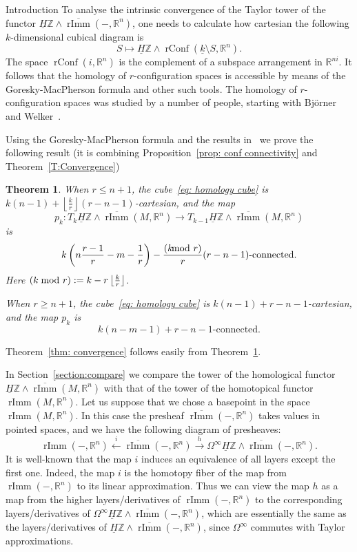 \documentclass[12pt]{amsart}
\newcommand{\R}{{\mathbb R}}
\newcommand{\Z}{{\mathbb Z}}
\newcommand{\rImm}{\operatorname{rImm}}
\newcommand{\rbar}{\overline{\rImm}}
\newcommand{\rConf}{\operatorname{rConf}}
\newcommand{\HZ}{\underline{H}\Z}
\theoremstyle{plain}
\newtheorem{thm}{Theorem}[section]
\theoremstyle{definition}
\theoremstyle{remark}
\begin{document}
\begin{section}{Introduction}
To analyse the intrinsic convergence of the Taylor tower of the functor $\HZ\wedge \rbar(-, \R^n)$, one needs to calculate how cartesian the following $k$-dimensional cubical diagram is
\begin{equation}\label{eq: homology cube}
S\mapsto \HZ \wedge \rConf(\underline{k}\setminus S, \R^n).
\end{equation}
The space $\rConf(i, \R^n)$ is the complement of a subspace arrangement in $\R^{ni}$. It follows that the homology of $r$-configuration spaces is accessible by means of the Goresky-MacPherson formula and other such tools. The homology of $r$-configuration spaces was studied by a number of people, starting with Bj\"orner and Welker~\cite{Bjo95}.

Using the Goresky-MacPherson formula and the results in~\cite{Bjo95} we prove the following result (it is combining Proposition~\ref{prop: conf connectivity} and Theorem~\ref{T:Convergence})
\begin{thm}\label{thm: connectivity}
When $r\le n+1$, the cube~\eqref{eq: homology cube} is $k(n-1)+\left\lfloor \frac{k}{r}\right\rfloor (r-n-1)$-cartesian, and the map
\begin{equation*}
p_k\colon T_k\HZ\wedge \rbar(M, \R^n)\to T_{k-1}\HZ\wedge \rbar(M, \R^n)
\end{equation*}
is $$k\left(n\frac{r-1}{r}-m-\frac{1}{r}\right)-\frac{(k\hspace{-8pt}\mod r)}{r} (r-n-1)\mbox{-connected.}$$ Here $(k\hspace{-4pt}\mod r):=k-r\left\lfloor \frac{k}{r}\right\rfloor$.

When $r\ge n+1$, the cube~\eqref{eq: homology cube} is $k(n-1)+r-n-1$-cartesian, and the map $p_k$ is $$k(n-m-1)+r-n-1\mbox{-connected.}$$
\end{thm}
Theorem~\ref{thm: convergence} follows easily from Theorem~\ref{thm: connectivity}.

In Section~\ref{section:compare} we compare the tower of the homological functor $\HZ\wedge \rbar(M, \R^n)$ with that of the tower of the homotopical functor $\rImm(M, \R^n)$. Let us suppose that we chose a basepoint in the space $\rImm(M, \R^n)$. In this case the presheaf $\rbar(-, \R^n)$ takes values in pointed spaces, and we have the following diagram of presheaves:
\begin{equation}\label{eq: comparison}
\rImm(-, \R^n)\xleftarrow{i} \rbar(-, \R^n) %
\xrightarrow{h} \Omega^\infty\HZ\wedge \rbar(-, \R^n).
\end{equation}
It is well-known that the map $i$ induces an equivalence of all layers except the first one. Indeed, the map $i$ is the homotopy fiber of the map from $\rImm(-, \R^n)$ to its linear approximation. Thus we can view the map $h$ as a map from the higher layers/derivatives of $\rImm(-, \R^n)$ to the corresponding layers/derivatives of $\Omega^\infty\HZ\wedge \rbar(-, \R^n)$, which are essentially the same as the layers/derivatives of $\HZ\wedge \rbar(-, \R^n)$, since $\Omega^\infty$ commutes with Taylor approximations.


\end{section}
\end{document}
